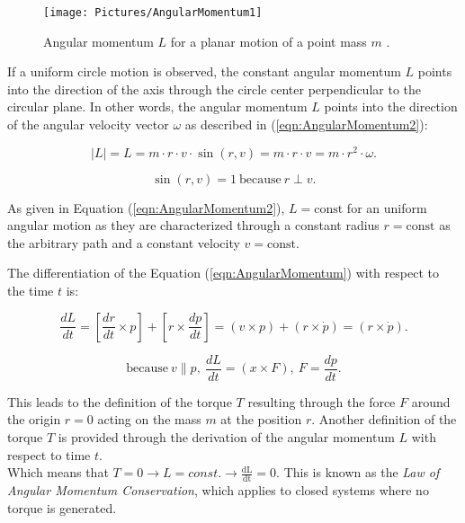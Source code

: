 \begin{figure}[H]
{\centering
\texttt{[image: Pictures/AngularMomentum1]}
\caption{Angular momentum $L$ for a planar motion of a point mass $m$ \cite{Demtroder.2017}.}
\label{fig:AngularMomentum1}
}
\end{figure}

If a uniform circle motion is observed, the constant angular momentum $L$ points into the direction of the axis through the circle center perpendicular to the circular plane. In other words, the angular momentum $L$ points into the direction of the angular velocity vector $\omega$ as described in (\ref{eqn:AngularMomentum2}):

\begin{equation}
|L| = L = m \cdot r \cdot v \cdot \sin{(r,v)} = m \cdot r \cdot v = m \cdot r^{2} \cdot \omega .
\label{eqn:AngularMomentum2}
\end{equation}

\begin{equation*}
\sin{(r,v)} = 1 \ \text{because} \ r \perp v .
\end{equation*}

As given in Equation (\ref{eqn:AngularMomentum2}), $L = \text{const}$ for an uniform angular motion as they are characterized through a constant radius $r= \text{const}$ as the arbitrary path and a constant velocity $v = \text{const}$.

The differentiation of the Equation (\ref{eqn:AngularMomentum}) with respect to the time $t$ is:


\begin{equation}
\frac{dL}{dt} = \left[ \dfrac{dr}{dt} \times p \right] + [r \times \frac{dp}{dt}] = (v \times p) + (r \times \dot{p}) = (r \times \dot{p}) .
\label{eqn:DiffAngularMomentum}
\end{equation}

\begin{equation*}
\text{because} \  v \parallel p , \ \frac{dL}{dt} = (x \times F), \ F = \frac{dp}{dt}. 
\end{equation*}

This leads to the definition of the torque $T$ resulting through the force $F$ around the origin $r =0$ acting on the mass $m$ at the position $r$. Another definition of the torque $T$ is provided through the derivation of the angular momentum $L$ with respect to time $t$.\\
Which means that $T = 0 \to L = const. \to \frac{\text{dL}}{\text{dt}} = 0$. This is known as the \textit{Law of Angular Momentum Conservation}, which applies to closed systems where no torque is generated.

